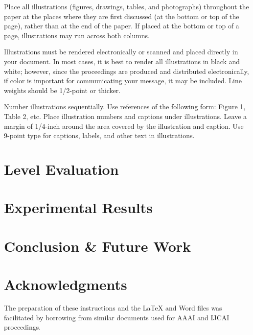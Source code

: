 \documentclass[letterpaper]{article}
\begin{document}
Place all illustrations (figures, drawings, tables, and photographs)
throughout the paper at the places where they are first discussed (at the bottom
or top of the page), rather than at the end of the paper. If placed at the bottom or top of
a page, illustrations may run across both columns.

Illustrations must be rendered electronically or scanned and placed
directly in your document. In most cases, it is best to render all illustrations
in black and white; however, since the proceedings are produced and distributed electronically, if color
is important for communicating your message, it may be included. Line weights should
be 1/2-point or thicker.

Number illustrations sequentially. Use references of the following
form: Figure 1, Table 2, etc. Place illustration numbers and captions
under illustrations. Leave a margin of 1/4-inch around the area
covered by the illustration and caption.  Use 9-point type for
captions, labels, and other text in illustrations.
\section{Level Evaluation}

\section{Experimental Results}

\section{Conclusion \& Future Work}

\section{Acknowledgments}
The preparation of these instructions and the \LaTeX{} and Word files was 
facilitated by borrowing from similar documents used for AAAI and IJCAI proceedings.










\end{document}
